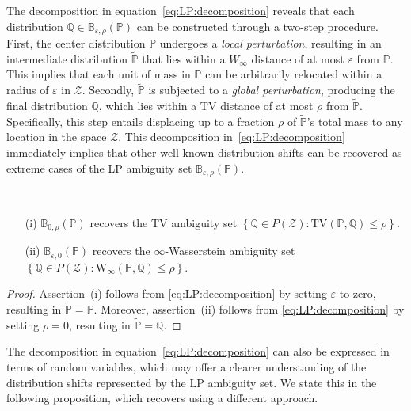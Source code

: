 \documentclass[11pt,a4paper]{article}
\begin{document}
The decomposition in equation~\eqref{eq:LP:decomposition} reveals that each distribution $\mathbb Q \in \mathbb{B}_{\varepsilon,\rho}(\mathbb P)$ can be constructed through a two-step procedure. First, the center distribution $\mathbb P$ undergoes a \emph{local perturbation}, resulting in an intermediate distribution $\widetilde{\mathbb P}$ that lies within a $W_\infty$ distance of at most $\varepsilon$ from $\mathbb P$. This implies that each unit of mass in $\mathbb P$ can be arbitrarily relocated within a radius of $\varepsilon$ in $\mathcal Z$. Secondly, $\widetilde{\mathbb P}$ is subjected to a \emph{global perturbation}, producing the final distribution $\mathbb Q$, which lies within a TV distance of at most $\rho$ from $\widetilde{\mathbb P}$. Specifically, this step entails displacing up to a fraction $\rho$ of $\widetilde{\mathbb P}$'s total mass to any location in the space $\mathcal Z$. This decomposition in~\eqref{eq:LP:decomposition} immediately implies that other well-known distribution shifts can be recovered as extreme cases of the LP ambiguity set $\mathbb B_{\varepsilon,\rho}(\mathbb P)$.

\begin{corollary}~
\label{cor:relationship:other:metrics}
\begin{itemize}
    \item[(i)] $\mathbb B_{0,\rho}(\mathbb P)$ recovers the TV ambiguity set $\left\{\mathbb Q\in P(\mathcal{Z}): \text{TV}(\mathbb P, \mathbb Q)\leq \rho\right\}$.
    
    \item[(ii)] $\mathbb B_{\varepsilon,0}(\mathbb P)$ recovers the $\infty$-Wasserstein ambiguity set $\left\{\mathbb Q\in P(\mathcal{Z}): \text{W}_\infty(\mathbb P, \mathbb Q)\leq \rho\right\}$.
\end{itemize}
\end{corollary}
\begin{proof}
Assertion~(i) follows from \eqref{eq:LP:decomposition} by setting $\varepsilon$ to zero, resulting in $\widetilde{\mathbb P} = \mathbb P$. Moreover, assertion~(ii) follows from \eqref{eq:LP:decomposition} by setting $\rho = 0$, resulting in $\widetilde{\mathbb P} = \mathbb Q$.
\end{proof}

The decomposition in equation~\eqref{eq:LP:decomposition} can also be expressed in terms of random variables, which may offer a clearer understanding of the distribution shifts represented by the LP ambiguity set. We state this in the following proposition, which recovers \cite[Theorem~2.1]{Bennouna_2023} using a different approach.
\end{document}

